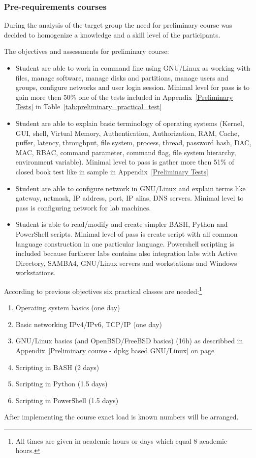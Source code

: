 \subsubsection{Pre-requirements courses}

During the analysis of the target group the need for preliminary course was decided to homogenize a knowledge and a skill level of the participants.

The objectives and assessments for preliminary course:
\begin{itemize}
\item Student are able to work in command line using GNU/Linux as working with files, manage software, manage disks and partitions, manage users and groups, configure networks and user login session. Minimal level for pass is to gain more then 50\% one of the tests included in Appendix~\ref{Preliminary Tests} in Table~\ref{tab:preliminary_practical_test}
\item Student are able to explain basic terminology of operating systems (Kernel, GUI, shell, Virtual Memory, Authentication, Authorization, RAM, Cache, puffer, latency, throughput, file system, process, thread, password hash, DAC, MAC, RBAC, command parameter, command flag, file system hierarchy, environment variable). Minimal level to pass is gather more then 51\% of closed book test like in sample in Appendix~\ref{Preliminary Tests}
\item Student are able to configure network in GNU/Linux and explain terms like gateway, netmask, IP address, port, IP alias, DNS servers. Minimal level to pass is configuring network for lab machines.
\item Student is able to read/modify and create simpler BASH, Python and PowerShell scripts. Minimal level of pass is create script with all common language construction in one particular language. Powershell scripting is included because furtherer labs contains also integration labs with Active Directory, SAMBA4, GNU/Linux servers and workstations and Windows workstations.
\end{itemize}

According to previous objectives six practical classes are needed:\footnote{All times are given in academic hours or days which equal 8 academic hours.}
\begin{enumerate}[label=LAB \arabic*.,leftmargin=*]
\item Operating system basics (one day)
\item Basic networking IPv4/IPv6, TCP/IP (one day)
\item GNU/Linux basics (and OpenBSD/FreeBSD basics) (16h) as describbed in Appendix~\ref{Preliminary course - dpkg based GNU/Linux} on page~\pageref{Preliminary course - dpkg based GNU/Linux}
\item Scripting in BASH (2 days)
\item Scripting in Python (1.5 days)
\item Scripting in PowerShell (1.5 days)
\end{enumerate}
After implementing the course exact load is known numbers will be arranged.


